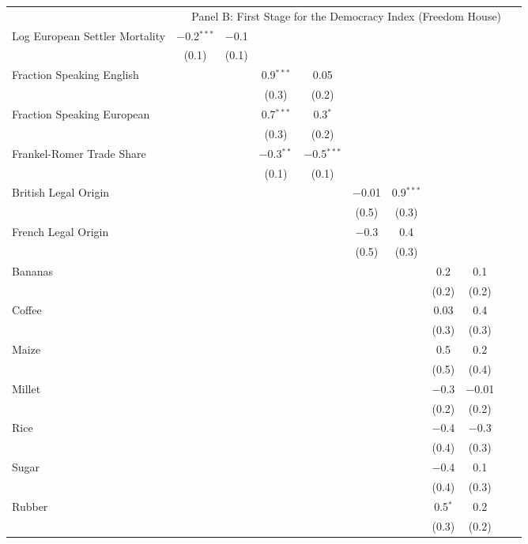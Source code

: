 \begin{table}[!htbp]
\begin{threeparttable}
\begin{tabular}{@{\extracolsep{0pt}}lcccccccccc}
 
   & \multicolumn{10}{c}{Panel B: First Stage for the Democracy Index (Freedom House)} \\
  Log European Settler Mortality & $-$0.2$^{***}$ & $-$0.1 &  &  &  &  &  &  &  &  \\ 
  & (0.1) & (0.1) &  &  &  &  &  &  &  &  \\ 
  Fraction Speaking English &  &  & 0.9$^{***}$ & 0.05 &  &  &  &  &  &  \\ 
  &  &  & (0.3) & (0.2) &  &  &  &  &  &  \\ 
  Fraction Speaking European &  &  & 0.7$^{***}$ & 0.3$^{*}$ &  &  &  &  &  &  \\ 
  &  &  & (0.3) & (0.2) &  &  &  &  &  &  \\ 
  Frankel-Romer Trade Share &  &  & $-$0.3$^{**}$ & $-$0.5$^{***}$ &  &  &  &  &  &  \\ 
  &  &  & (0.1) & (0.1) &  &  &  &  &  &  \\ 
  British Legal Origin &  &  &  &  & $-$0.01 & 0.9$^{***}$ &  &  &  &  \\ 
  &  &  &  &  & (0.5) & (0.3) &  &  &  &  \\ 
  French Legal Origin &  &  &  &  & $-$0.3 & 0.4 &  &  &  &  \\ 
  &  &  &  &  & (0.5) & (0.3) &  &  &  &  \\ 
  Bananas &  &  &  &  &  &  & 0.2 & 0.1 &  &  \\ 
  &  &  &  &  &  &  & (0.2) & (0.2) &  &  \\ 
  Coffee &  &  &  &  &  &  & 0.03 & 0.4 &  &  \\ 
  &  &  &  &  &  &  & (0.3) & (0.3) &  &  \\ 
  Maize &  &  &  &  &  &  & 0.5 & 0.2 &  &  \\ 
  &  &  &  &  &  &  & (0.5) & (0.4) &  &  \\ 
  Millet &  &  &  &  &  &  & $-$0.3 & $-$0.01 &  &  \\ 
  &  &  &  &  &  &  & (0.2) & (0.2) &  &  \\ 
  Rice &  &  &  &  &  &  & $-$0.4 & $-$0.3 &  &  \\ 
  &  &  &  &  &  &  & (0.4) & (0.3) &  &  \\ 
  Sugar &  &  &  &  &  &  & $-$0.4 & 0.1 &  &  \\ 
  &  &  &  &  &  &  & (0.4) & (0.3) &  &  \\ 
  Rubber &  &  &  &  &  &  & 0.5$^{*}$ & 0.2 &  &  \\ 
  &  &  &  &  &  &  & (0.3) & (0.2) &  &  \\ 

\end{tabular}
\end{threeparttable}
\end{table}
